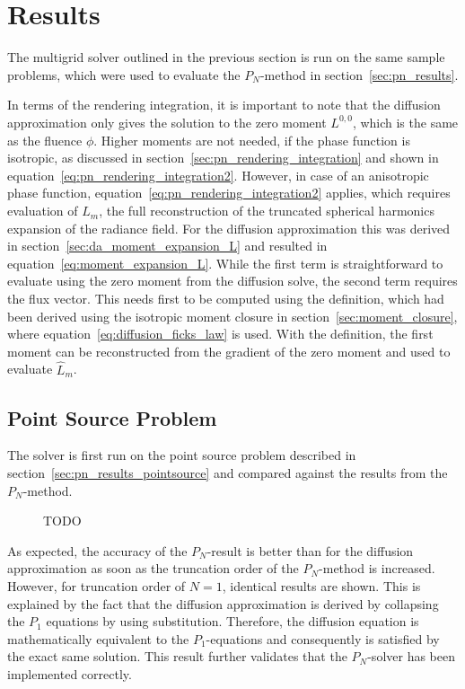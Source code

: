 \section{Results}
\label{sec:da_results}

The multigrid solver outlined in the previous section is run on the same sample problems, which were used to evaluate the $P_N$-method in section~\ref{sec:pn_results}.

In terms of the rendering integration, it is important to note that the diffusion approximation only gives the solution to the zero moment $L^{0,0}$, which is the same as the fluence $\phi$. Higher moments are not needed, if the phase function is isotropic, as discussed in section~\ref{sec:pn_rendering_integration} and shown in equation~\ref{eq:pn_rendering_integration2}. However, in case of an anisotropic phase function, equation~\ref{eq:pn_rendering_integration2} applies, which requires evaluation of $\widehat{L}_m$, the full reconstruction of the truncated spherical harmonics expansion of the radiance field. For the diffusion approximation this was derived in section~\ref{sec:da_moment_expansion_L} and resulted in equation~\ref{eq:moment_expansion_L}. While the first term is straightforward to evaluate using the zero moment from the diffusion solve, the second term requires the flux vector. This needs first to be computed using the definition, which had been derived using the isotropic moment closure in section~\ref{sec:moment_closure}, where equation~\ref{eq:diffusion_ficks_law} is used. With the definition, the first moment can be reconstructed from the gradient of the zero moment and used to evaluate $\widehat{L}_m$.

\subsection{Point Source Problem}
\label{sec:da_results_pointsource}

The solver is first run on the point source problem described in section~\ref{sec:pn_results_pointsource} and compared against the results from the $P_N$-method.
\begin{figure}[h]
\centering
{}
\caption{TODO}
\label{fig:da_results_pointsource_1}
\end{figure}

As expected, the accuracy of the $P_N$-result is better than for the diffusion approximation as soon as the truncation order of the $P_N$-method is increased. However, for truncation order of $N=1$, identical results are shown. This is explained by the fact that the diffusion approximation is derived by collapsing the $P_1$ equations by using substitution. Therefore, the diffusion equation is mathematically equivalent to the $P_1$-equations and consequently is satisfied by the exact same solution. This result further validates that the $P_N$-solver has been implemented correctly.

